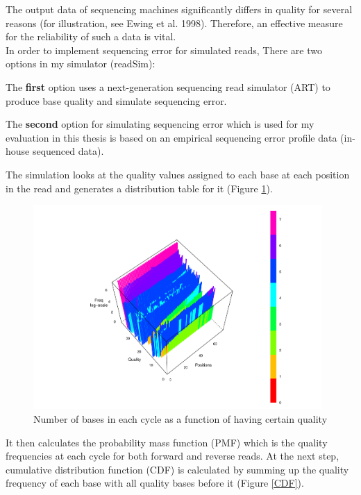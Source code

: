 \documentclass[11pt,a4paper]{report}
\begin{document}
The output data of sequencing machines significantly differs in quality for 
several reasons (for illustration, see Ewing et al. 1998).  Therefore, an 
effective measure for the reliability of such a data is vital\cite{phred1}.\\


In order to implement sequencing error for simulated reads, There are two
options in my simulator (readSim):

The \textbf{first} option uses a next-generation sequencing read simulator 
(ART) to produce base quality and simulate sequencing error.


The \textbf{second} option for simulating sequencing error which is used for
my evaluation in this thesis is based on an empirical sequencing error profile 
data (in-house sequenced data).

The simulation looks at the quality values assigned to each base at each
position in the read and generates a distribution table for it (Figure \ref{hist}).

\begin{figure}[H]
\centering
\includegraphics[width=11cm]{pictures/3Dplot.pdf}
\caption{Number of bases in each cycle as a function of having certain quality}
\label{hist}
\end{figure}

It then calculates the probability mass function (PMF) which is the quality 
frequencies at each cycle for both forward and reverse reads. At the next 
step, cumulative distribution function (CDF) is calculated by summing up the 
quality frequency of each base with all quality bases before it (Figure \ref{CDF}).
\end{document}
